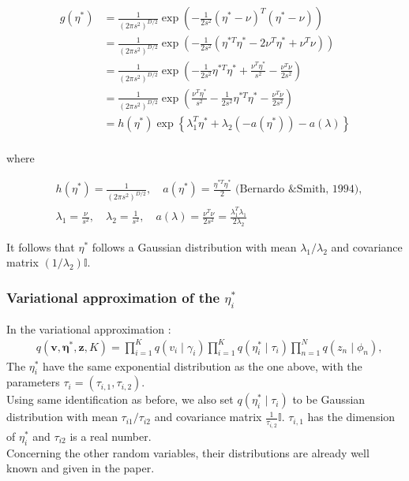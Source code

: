 \documentclass{article}
\begin{document}
\begin{align*}
g(\eta^*) &= \frac{1}{(2\pi s^2)^{D/2}}\exp\left(-\frac{1}{2s^2}(\eta^*-\nu)^T(\eta^*-\nu)\right) \\
&= \frac{1}{(2\pi s^2)^{D/2}}\exp\left(-\frac{1}{2s^2}(\eta^{*T}\eta^* - 2\nu^T\eta^*+\nu^T\nu)\right) \\
&= \frac{1}{(2\pi s^2)^{D/2}}\exp\left(-\frac{1}{2s^2}\eta^{*T}\eta^* + \frac{ \nu^T\eta^*}{s^2}-\frac{\nu^T\nu}{2s^2}\right) \\
&= \frac{1}{(2\pi s^2)^{D/2}}\exp\left(\frac{ \nu^T\eta^*}{s^2} -\frac{1}{2s^2}\eta^{*T}\eta^* -\frac{\nu^T\nu}{2s^2}\right) \\
&= h\left(\eta^*\right) \exp \left\{\lambda_1^T \eta^*+\lambda_2\left(-a\left(\eta^*\right)\right)-a(\lambda)\right\} \\
\end{align*}

where

\begin{align*}
&h(\eta^*) = \frac{1}{(2\pi s^2)^{D/2}}, \quad a(\eta^*) = \frac{\eta^{*T}\eta^*}{2} \text{ (Bernardo \& Smith, 1994)}, \\
&\lambda_1 = \frac{\nu}{s^2}, \quad \lambda_2 = \frac{1}{s^2}, \quad a(\lambda) = \frac{\nu^T\nu}{2s^2} = \frac{\lambda_1^T\lambda_1}{2\lambda_2}
\end{align*}



It follows that \(\eta^*\) follows a Gaussian distribution with mean \(\lambda_1 / \lambda_2\) and covariance matrix \((1/\lambda_2)\mathbb{I}\).

\subsubsection{Variational approximation of the $\eta_i^*$}
In the variational approximation :
$$
\begin{aligned}
& q\left(\mathbf{v}, \boldsymbol{\eta}^*, \mathbf{z}, K\right)=
\prod_{i=1}^K q\left(v_i \mid \gamma_i\right) \prod_{i=1}^K q\left(\eta_i^* \mid \tau_i\right) \prod_{n=1}^N q\left(z_n \mid \phi_n\right),
\end{aligned}
$$
The $\eta_i^*$ have the same exponential distribution as the one above, with the parameters $\tau_i = (\tau_{i,1}, \tau_{i,2})$. \\
Using same identification as before, we also set \(q(\eta_i^* \mid \tau_i)\) to be Gaussian distribution with mean \(\tau_{i1}/\tau_{i2}\) and covariance matrix \(\frac{1}{\tau_{i,2}}\mathbb{I}\). $\tau_{i,1}$ has the dimension of $\eta_i^*$ and $\tau_{i2}$ is a real number.\\
Concerning the other random variables, their distributions are already well known and given in the paper.
\end{document}
